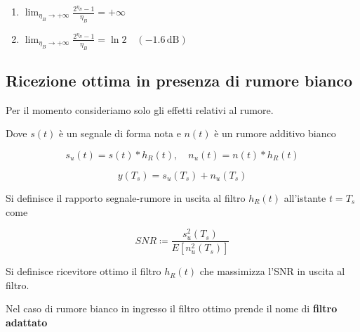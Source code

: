 \begin{enumerate}
  \item 
  $\lim_{\eta_B \to +\infty} \frac{2^{\eta_B } - 1}{\eta_B } = +\infty$
  

  \item $\lim_{\eta_B \to +\infty} \frac{2^{\eta_B } - 1}{\eta_B } = \ln{2} \quad (-1.6 \, \text{dB})$
  
\end{enumerate}


\subsection*{Ricezione ottima in presenza di rumore bianco}

Per il momento consideriamo solo gli effetti relativi al rumore.

\begin{center}
\end{center}
Dove \( s(t) \) è un segnale di forma nota e \( n(t) \) è un rumore additivo bianco

\[
s_u(t) = s(t) \ast h_R(t), \quad n_u(t) = n(t) \ast h_R(t)
\]

\[
y(T_s) = s_u(T_s) + n_u(T_s)
\]

Si definisce il rapporto segnale-rumore in uscita al filtro \( h_R(t) \) all'istante \( t = T_s \) come

\[
SNR \coloneqq \frac{s_u^2(T_s)}{E[n_u^2(T_s)]}
\]

Si definisce ricevitore ottimo il filtro \( h_R(t) \) che massimizza l'SNR in uscita al filtro.

Nel caso di rumore bianco in ingresso il filtro ottimo prende il nome di \textbf{filtro adattato}


